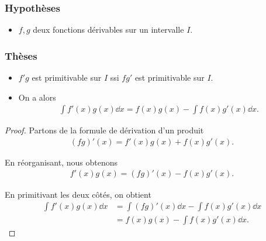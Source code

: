 \documentclass[main.tex]{subfiles}
\begin{document}
\begin{proposition}

    \subsubsection{Hypothèses}
    \begin{itemize}
        \item $f, g$ deux fonctions dérivables sur un intervalle $I$.
    \end{itemize}

    \subsubsection{Thèses}
    \begin{itemize}
        \item $f' g$ est primitivable sur $I$ ssi $f g'$ est primitivable sur $I$.
        \item On a alors
            \begin{align}
                \int f'(x) g(x) \dd x
                = f(x) g(x)
                - \int f(x) g'(x) \dd x.
            \end{align}
    \end{itemize}
\end{proposition}
\begin{proof}
    Partons de la formule de dérivation d'un produit
    \begin{align*}
        (f g)'(x) = f'(x) g(x) + f(x) g'(x).
    \end{align*}

    En réorganisant,
    nous obtenons
    \begin{align*}
        f'(x) g(x) = (f g)'(x) - f(x) g'(x).
    \end{align*}

    En primitivant les deux côtés,
    on obtient
    \begin{align}
        \int f'(x) g(x) \dd x
        &= \int (f g)'(x) \dd x - \int f(x) g'(x) \dd x\\
        &= f(x) g(x) - \int f(x) g'(x) \dd x.
    \end{align}
\end{proof}
\end{document}
